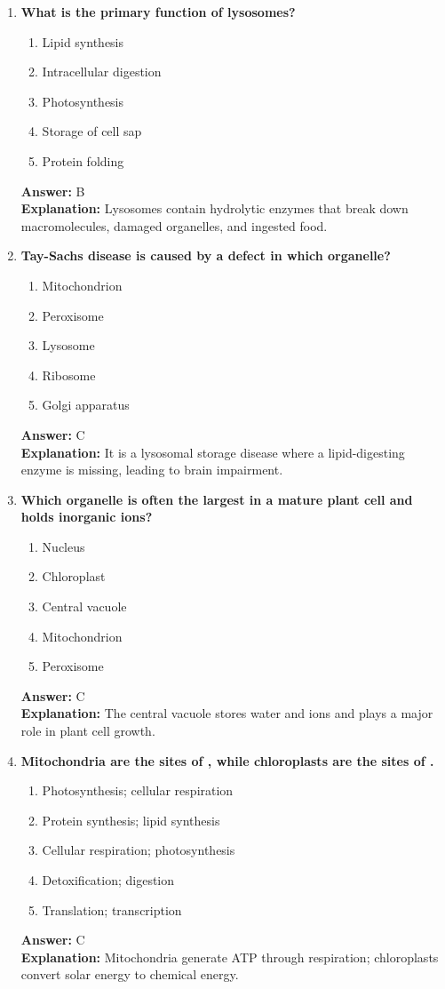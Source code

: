 \documentclass[11pt, a4paper]{article}
\begin{document}
\begin{enumerate}[leftmargin=*, label=\arabic*.]
\item \textbf{What is the primary function of lysosomes?}
\begin{enumerate}[label=\Alph*.]
\item Lipid synthesis
\item Intracellular digestion
\item Photosynthesis
\item Storage of cell sap
\item Protein folding
\end{enumerate}
\textbf{Answer:} B \\
\textbf{Explanation:} Lysosomes contain hydrolytic enzymes that break down macromolecules, damaged organelles, and ingested food.

\item \textbf{Tay-Sachs disease is caused by a defect in which organelle?}
\begin{enumerate}[label=\Alph*.]
\item Mitochondrion
\item Peroxisome
\item Lysosome
\item Ribosome
\item Golgi apparatus
\end{enumerate}
\textbf{Answer:} C \\
\textbf{Explanation:} It is a lysosomal storage disease where a lipid-digesting enzyme is missing, leading to brain impairment.

\item \textbf{Which organelle is often the largest in a mature plant cell and holds inorganic ions?}
\begin{enumerate}[label=\Alph*.]
\item Nucleus
\item Chloroplast
\item Central vacuole
\item Mitochondrion
\item Peroxisome
\end{enumerate}
\textbf{Answer:} C \\
\textbf{Explanation:} The central vacuole stores water and ions and plays a major role in plant cell growth.

\item \textbf{Mitochondria are the sites of \underline{\hspace{1cm}}, while chloroplasts are the sites of \underline{\hspace{1cm}}.}
\begin{enumerate}[label=\Alph*.]
\item Photosynthesis; cellular respiration
\item Protein synthesis; lipid synthesis
\item Cellular respiration; photosynthesis
\item Detoxification; digestion
\item Translation; transcription
\end{enumerate}
\textbf{Answer:} C \\
\textbf{Explanation:} Mitochondria generate ATP through respiration; chloroplasts convert solar energy to chemical energy.


\end{enumerate}
\end{document}

